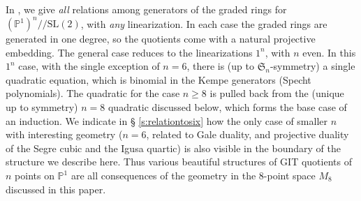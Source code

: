 \documentclass{amsart}
\theoremstyle{definition}
\theoremstyle{remark}
\def\SL{\mathrm{SL}}
\def\SS{\mathfrak{S}}
\def\proj{\mathbb{P}}
\def\cq{/\!/}
\begin{document}
In \cite{hmsv2}, we give {\em all} relations among generators of the graded rings for $(\proj^1)^n \cq \SL(2)$, with
{\em any} linearization.  In each case the graded rings are generated in one degree, so the quotients come with a
natural projective embedding.  The general case reduces to the linearizations $1^n$, with $n$ even.  In this $1^n$ case,
with the single exception of $n=6$, there is (up to $\SS_n$-symmetry) a single quadratic equation, which is binomial in
the Kempe generators (Specht polynomials).  The quadratic for the case $n \geq 8$ is pulled back from the (unique up to
symmetry) $n=8$ quadratic discussed below, which forms the base case of an induction.  We  indicate in \S
\ref{s:relationtosix} how the only case of smaller $n$ with interesting geometry ($n=6$, related to Gale duality, and
projective duality of the Segre cubic and the Igusa quartic) is also visible in  the boundary of the structure we
describe here.  Thus various beautiful structures of GIT quotients of $n$ points on $\proj^1$ are all consequences of
the  geometry in the $8$-point space $M_8$ discussed in this paper. 
\end{document}

